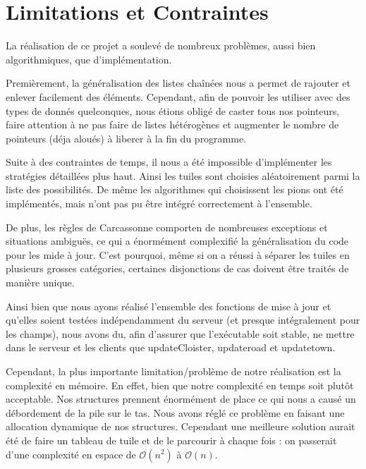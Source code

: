 \section{Limitations et Contraintes}

La réalisation de ce projet a soulevé de nombreux problèmes, aussi bien algorithmiques, que d'implémentation. 

\vspace{0.5cm}

Premièrement, la généralisation des listes chaînées nous a permet de rajouter et enlever facilement des éléments. Cependant, afin de pouvoir les utiliser avec des types de donnés quelconques, nous étions obligé de caster tous nos pointeurs, faire attention à ne pas faire de listes hétérogènes et augmenter le nombre de pointeurs (déja aloués) à liberer à la fin du programme.

\vspace{0.5cm}

Suite à des contraintes de temps, il nous a été impossible d'implémenter les stratégies détaillées plus haut. Ainsi les tuiles sont choisies aléatoirement parmi la liste des possibilités. De même les algorithmes qui choisissent les pions ont été implémentés, mais n'ont pas pu être intégré correctement à l'ensemble.

De plus, les règles de Carcassonne comporten de nombreuses exceptions et situations ambiguës, ce qui a énormément complexifié la généralisation du code pour les mide à jour. C'est pourquoi, même si on a réussi à séparer les tuiles en plusieurs grosses catégories, certaines disjonctions de cas doivent être traités de manière unique.

Ainsi bien que nous ayons réalisé l'ensemble des fonctions de mise à jour et qu'elles soient testées indépendamment du serveur (et presque intégralement pour les champs), nous avons du, afin d'assurer que l'exécutable soit stable, ne mettre dans le serveur et les clients que updateCloister, updateroad et updatetown.

\vspace{0.5cm}

Cependant, la plus importante limitation/problème de notre réalisation est la complexité en mémoire. En effet, bien que notre complexité en temps soit plutôt acceptable.
Nos structures prennent énormément de place ce qui nous a causé un débordement de la pile sur le tas. Nous avons réglé ce problème en faisant une allocation dynamique de nos structures. Cependant une meilleure solution aurait été de faire un tableau de tuile et de le parcourir à chaque fois : on passerait d'une complexité en espace de $\mathcal{O}(n^2)$ à $\mathcal{O}(n)$.